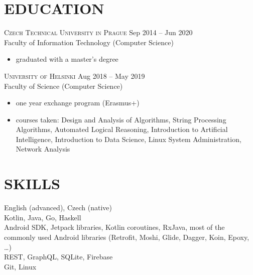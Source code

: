 \documentclass[margin]{res}
\begin{document}
\begin{resume}
        \section{EDUCATION}
        \textsc{Czech Technical University in Prague} \hfill Sep 2014 -- Jun 2020\\
        Faculty of Information Technology (Computer Science)
        \vspace{2mm}
        \begin{itemize}
            \item graduated with a master's degree
        \end{itemize}

        \vspace{5mm}

        \textsc{University of Helsinki} \hfill Aug 2018 -- May 2019\\
        Faculty of Science (Computer Science)
        \vspace{2mm}
        \begin{itemize}
            \item one year exchange program (Erasmus+)
            \item courses taken: Design and Analysis of Algorithms, String Processing Algorithms, Automated Logical Reasoning, Introduction to Artificial Intelligence, Introduction to Data Science, Linux System Administration, Network Analysis
        \end{itemize}

        \section{SKILLS}
        \onehalfspacing
        English (advanced), Czech (native)\\
        Kotlin, Java, Go, Haskell \\
        Android SDK, Jetpack libraries, Kotlin coroutines, RxJava, most of the commonly used
        Android libraries (Retrofit, Moshi, Glide, Dagger, Koin, Epoxy, \ldots) \\
        REST, GraphQL, SQLite, Firebase \\
        Git, Linux

    \end{resume}
\end{document}
